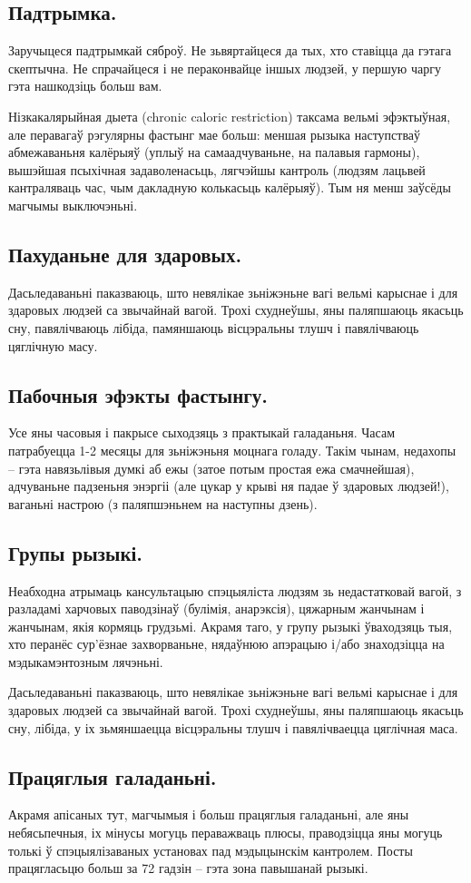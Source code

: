 \subsection{Падтрымка.}
Заручыцеся падтрымкай сяброў. Не зьвяртайцеся да тых, хто ставіцца да гэтага скептычна. Не спрачайцеся і не пераконвайце іншых людзей, у першую чаргу гэта нашкодзіць больш вам.

Нізкакалярыйная дыета (chronic caloric restriction) таксама вельмі эфэктыўная, але перавагаў рэгулярны фастынг мае больш: меншая рызыка наступстваў абмежаваньня калёрыяў (уплыў на самаадчуваньне, на палавыя гармоны), вышэйшая псыхічная задаволенасьць, лягчэйшы кантроль (людзям лацьвей кантраляваць час, чым дакладную колькасьць калёрыяў). Тым ня менш заўсёды магчымы выключэньні.

\subsection{Пахуданьне для здаровых.}
Дасьледаваньні паказваюць, што невялікае зьніжэньне вагі вельмі карыснае і для здаровых людзей са звычайнай вагой. Трохі схуднеўшы, яны паляпшаюць якасьць сну, павялічваюць лібіда, памяншаюць вісцэральны тлушч і павялічваюць цяглічную масу.

\subsection{Пабочныя эфэкты фастынгу.}
Усе яны часовыя і пакрысе сыходзяць з практыкай галаданьня. Часам патрабуецца 1-2 месяцы для зьніжэньня моцнага голаду. Такім чынам, недахопы – гэта навязьлівыя думкі аб ежы (затое потым простая ежа смачнейшая), адчуваньне падзеньня энэргіі (але цукар у крыві ня падае ў здаровых людзей!), ваганьні настрою (з паляпшэньнем на наступны дзень).

\subsection{Групы рызыкі.}
Неабходна атрымаць кансультацыю спэцыяліста людзям зь недастатковай вагой, з разладамі харчовых паводзінаў (булімія, анарэксія), цяжарным жанчынам і жанчынам, якія кормяць грудзьмі. Акрамя таго, у групу рызыкі ўваходзяць тыя, хто перанёс сур'ёзнае захворваньне, нядаўнюю апэрацыю і/або знаходзіцца на мэдыкамэнтозным лячэньні.

Дасьледаваньні паказваюць, што невялікае зьніжэньне вагі вельмі карыснае і для здаровых людзей са звычайнай вагой. Трохі схуднеўшы, яны паляпшаюць якасьць сну, лібіда, у іх зьмяншаецца вісцэральны тлушч і павялічваецца цяглічная маса.

\subsection{Працяглыя галаданьні.}
Акрамя апісаных тут, магчымыя і больш працяглыя галаданьні, але яны небясьпечныя, іх мінусы могуць пераважваць плюсы, праводзіцца яны могуць толькі ў спэцыялізаваных установах пад мэдыцынскім кантролем. Посты працягласьцю больш за 72 гадзін – гэта зона павышанай рызыкі.
